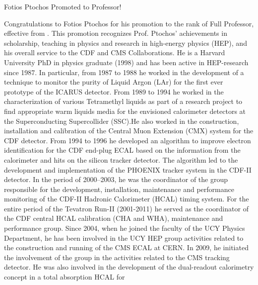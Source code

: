 \begin{headline}[enhanced, tikz={rotate=0}, width=0.6\textwidth]{Fotios Ptochos Promoted to Professor!}
\begin{multicols}{3}
    Congratulations to Fotios Ptochos for his promotion to the rank of
    Full Professor, effective from \MyDate. This promotion recognizes
    Prof. Ptochos' achievements in scholarship, teaching in physics
    and research in high-energy physics (HEP), and his overall service
    to the CDF and CMS Collaborations. He is a Harvard University PhD
    in physics graduate (1998) and has been active in HEP-research%
    since 1987. In particular, from 1987 to 1988 he worked in the development of
    a technique to monitor the purity of Liquid Argon (LAr) for the
    first ever prototype of the ICARUS detector.
    From 1989 to 1994 he worked in the characterization of
    various Tetramethyl liquids as part of a research project to find
    appropriate warm liquids media for the envisioned calorimeter
    detectors at the Superconducting Supercollider (SSC).He also
    worked in the construction, installation and 
    calibration of the Central Muon Extension (CMX) system for the CDF
    detector. From 1994 to 1996 he developed an algorithm to improve
    electron identification for the CDF end-plug ECAL based on the
    information from the calorimeter and hits on the silicon tracker
    detector. The algorithm led to the development and implementation of
    the PHOENIX tracker system in the CDF-II detector. 
    In the period of 2000–2003, he was the coordinator of the group
    responsible for the development, installation, maintenance and
    performance monitoring of the CDF-II Hadronic Calorimeter (HCAL)
    timing system. For the entire period of the Tevatron Run-II
    (2001-2011) he served as the coordinator of the CDF central HCAL
    calibration (CHA and WHA), maintenance and performance group. Since
    2004, when he joined the faculty of the UCY Physics Department, he has
    been involved in the UCY HEP group activities related to the
    construction and running of the CMS ECAL at CERN. In 2009, he
    initiated the involvement of the group in the activities related to
    the CMS tracking detector. He was also involved in the development of
    the dual-readout calorimetry concept in a total absorption HCAL for

\end{multicols}
\end{headline}

